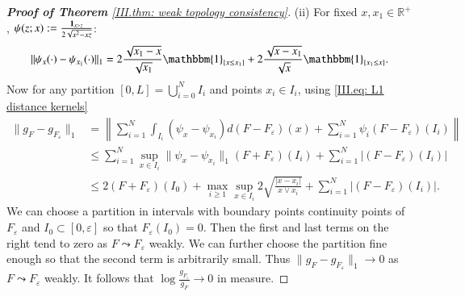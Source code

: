\begin{proof}[\hypertarget{III.proof consistency in weak topology}{\textbf{Proof of Theorem} \ref{III.thm: weak topology consistency}}]
    (ii) For fixed $x,x_1 \in \mathbb{R^+}$, $\psi(z;x) := \frac{\mathbf{1}_{x > z}}{2\sqrt{x^2 - xz}}$:
    \begin{align}\label{III.eq: L1 distance kernels}
        \| \psi_x(\cdot) - \psi_{x_1} (\cdot) \|_1 = 2 \frac{\sqrt{x_1 -x}}{\sqrt{x_1}} \mathbbm{1}_{\{ x \leq x_1 \}} + 2 \frac{\sqrt{x -x_1}}{\sqrt{x}} \mathbbm{1}_{\{ x_1 \leq x \}}. 
    \end{align} 
    Now for any partition $[0, L] = \bigcup_{i=0}^N I_i$ and points $x_i \in I_i$, using \eqref{III.eq: L1 distance kernels}
    \begin{align*}
    \|g_{\scriptscriptstyle{F}} - g_{\scriptscriptstyle{F_\varepsilon}}\|_1 &= \left\| \sum_{i=1}^N \int_{I_i} (\psi_x - \psi_{x_i}) d(F - F_\varepsilon)(x) + \sum_{i=1}^N \psi_i (F - F_\varepsilon)(I_i) \right\| \\
    &\leq \sum_{i=1}^N \sup_{x \in I_i} \| \psi_x - \psi_{x_i} \|_1 (F + F_\varepsilon)(I_i) + \sum_{i=1}^N |(F - F_\varepsilon)(I_i)| \\
    &\leq 2 (F + F_\varepsilon)(I_0) + \max_{i \geq 1} \sup_{x \in I_i} 2 \sqrt{\frac{|x - x_i|}{x \vee x_i}} + \sum_{i=1}^N |(F - F_\varepsilon)(I_i)|.
    \end{align*}
    We can choose a partition in intervals with boundary points continuity points of $F_\varepsilon$ and $I_0 \subset [0, \varepsilon]$ so that $F_\varepsilon (I_0) = 0$. Then the first and last terms on the right tend to zero as $F \leadsto F_\varepsilon$ weakly. We can further choose the partition fine enough so that the second term is arbitrarily small. Thus $\|g_{\scriptscriptstyle{F}} - g_{\scriptscriptstyle{F_\varepsilon}}\|_1 \rightarrow 0$ as $F \leadsto F_\varepsilon$ weakly. It follows that $\log \frac{g_{\scriptscriptstyle{F_\varepsilon}}}{g_{\scriptscriptstyle{F}}} \rightarrow 0$ in measure.


\end{proof}
